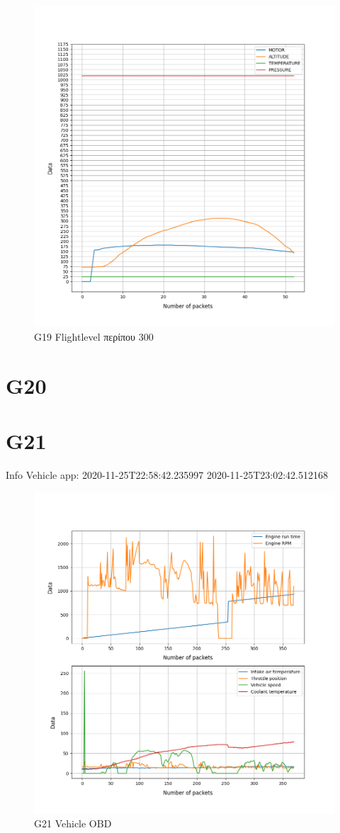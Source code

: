 \documentclass[hidelinks, 12pt, a4paper]{article}
\begin{document}
\begin{figure}[h!]
\centering
	\includegraphics[height=.4\textheight, width=\textwidth]{assets/session1/g19.png}
    \caption{G19 Flightlevel περίπου 300}
\end{figure}

\section{G20}

\section{G21}

Info Vehicle app:
2020-11-25T22:58:42.235997
2020-11-25T23:02:42.512168

\begin{figure}[h!]
\centering
	\includegraphics[height=.4\textheight, width=\textwidth]{assets/session1/g21.png}
    \caption{G21 Vehicle OBD}
\end{figure}
\end{document}

